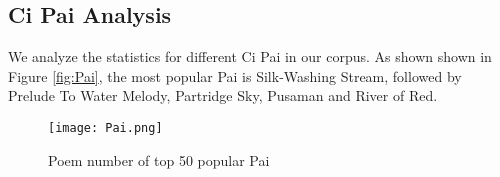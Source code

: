 %
\subsection {Ci Pai Analysis}
%
%
We analyze the statistics for different Ci Pai in our corpus. 
%
As shown shown in Figure \ref{fig:Pai}, the most popular Pai is Silk-Washing Stream, followed by Prelude To Water Melody, Partridge Sky, Pusaman and River of Red. 

\begin{figure}[htbp]
	\centering
	\texttt{[image: Pai.png]}
	\caption{Poem number of top 50 popular Pai}
	\label{fig:pai}
\end{figure}
%
